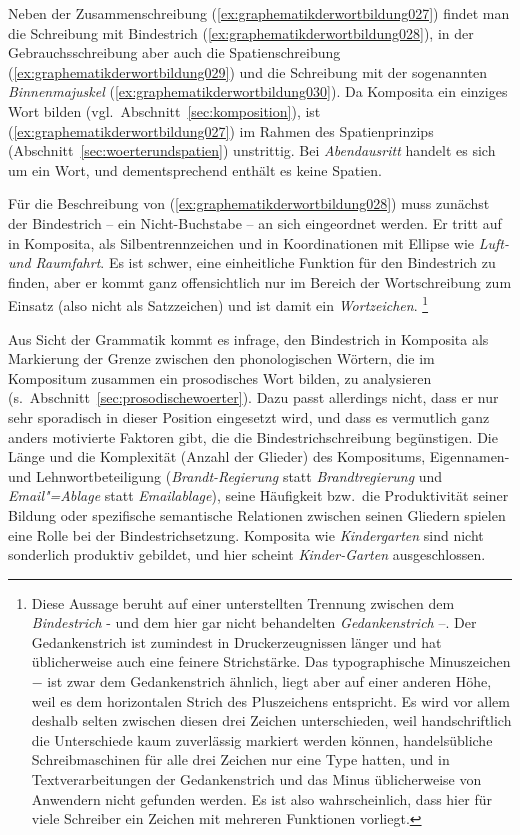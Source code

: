 Neben der Zusammenschreibung (\ref{ex:graphematikderwortbildung027}) findet man die Schreibung mit Bindestrich (\ref{ex:graphematikderwortbildung028}), in der Gebrauchsschreibung aber auch die Spatienschreibung (\ref{ex:graphematikderwortbildung029}) und die Schreibung mit der sogenannten \textit{Binnenmajuskel} (\ref{ex:graphematikderwortbildung030}).
Da Komposita ein einziges Wort bilden (vgl.\ Abschnitt~\ref{sec:komposition}), ist (\ref{ex:graphematikderwortbildung027}) im Rahmen des Spatienprinzips (Abschnitt~\ref{sec:woerterundspatien}) unstrittig.
Bei \textit{Abendausritt} handelt es sich um ein Wort, und dementsprechend enthält es keine Spatien.

Für die Beschreibung von (\ref{ex:graphematikderwortbildung028}) muss zunächst der Bindestrich -- ein Nicht-Buchstabe -- an sich eingeordnet werden.
Er tritt auf in Komposita, als Silbentrennzeichen und in Koordinationen mit Ellipse wie \textit{Luft- und Raumfahrt}.
Es ist schwer, eine einheitliche Funktion für den Bindestrich zu finden, aber er kommt ganz offensichtlich nur im Bereich der Wortschreibung zum Einsatz (also nicht als Satzzeichen) und ist damit ein \textit{Wortzeichen}.%
\footnote{Diese Aussage beruht auf einer unterstellten Trennung zwischen dem \textit{Bindestrich} - und dem hier gar nicht behandelten \textit{Gedankenstrich} --.
Der Gedankenstrich ist zumindest in Druckerzeugnissen länger und hat üblicherweise auch eine feinere Strichstärke.
Das typographische Minuszeichen $-$ ist zwar dem Gedankenstrich ähnlich, liegt aber auf einer anderen Höhe, weil es dem horizontalen Strich des Pluszeichens entspricht.
Es wird vor allem deshalb selten zwischen diesen drei Zeichen unterschieden, weil handschriftlich die Unterschiede kaum zuverlässig markiert werden können, handelsübliche Schreibmaschinen für alle drei Zeichen nur eine Type hatten, und in Textverarbeitungen der Gedankenstrich und das Minus üblicherweise von Anwendern nicht gefunden werden.
Es ist also wahrscheinlich, dass hier für viele Schreiber ein Zeichen mit mehreren Funktionen vorliegt.}


Aus Sicht der Grammatik kommt es infrage, den Bindestrich in Komposita als Markierung der Grenze zwischen den phonologischen Wörtern, die im Kompositum zusammen ein prosodisches Wort bilden, zu analysieren (s.\ Abschnitt~\ref{sec:prosodischewoerter}).
Dazu passt allerdings nicht, dass er nur sehr sporadisch in dieser Position eingesetzt wird, und dass es vermutlich ganz anders motivierte Faktoren gibt, die die Bindestrichschreibung begünstigen.
Die Länge und die Komplexität (Anzahl der Glieder) des Kompositums, Eigennamen- und Lehnwortbeteiligung (\textit{Brandt-Regierung} statt \textit{Brandtregierung} und \textit{Email"=Ablage} statt \textit{E\-mail\-ab\-lage}), seine Häufigkeit bzw.\ die Produktivität seiner Bildung oder spezifische semantische Relationen zwischen seinen Gliedern spielen eine Rolle bei der Bindestrichsetzung.
Komposita wie \textit{Kindergarten} sind \zB nicht sonderlich produktiv gebildet, und hier scheint \textit{Kinder-Garten} ausgeschlossen.

